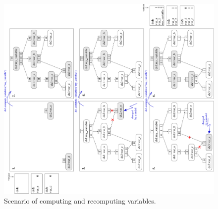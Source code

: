 \begin{figure}
\begin{center}
\includegraphics[scale=0.55, angle=-90]{images/variabletree1.pdf}
\caption{\label{fig:opus-core-variable-tree-1}\small Scenario of computing and
  recomputing variables.}
\end{center}
\end{figure}

